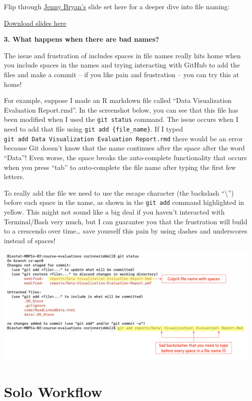 \documentclass[
]{book}
\begin{document}
Flip through \href{https://jennybryan.org/about/}{Jenny Bryan's} slide set here for a deeper dive into file naming:

\href{https://bph-storage.s3.us-west-1.amazonaws.com/git-for-humans/how-to-name-files.pdf}{Download slides here}

\textbf{3. What happens when there are bad names?}

The issue and frustration of includes spaces in file names really hits home when
you include spaces in the names and trying interacting with GitHub to add the files
and make a commit -- if you like pain and frustration -- you can try this at home!

For example, suppose I made an R markdown file called ``Data Visualization
Evaluation Report.rmd''. In the screenshot below, you can see that this file has
been modified when I used the \texttt{git\ status} command. The issue occurs when I need
to add that file using \texttt{git\ add\ \{file\_name\}}. If I typed \texttt{git\ add\ Data\ Visualization\ Evaluation\ Report.rmd}
there would be an error because Git doesn't know that the name continues after
the space after the word ``Data''! Even worse, the space breaks the auto-complete
functionality that occurs when you press ``tab'' to auto-complete the file name
after typing the first few letters.

To really add the file we need to use the escape character (the backslash ``\textbackslash{}'')
before each space in the name, as shown in the \texttt{git\ add} command highlighted in
yellow. This might not sound like a big deal
if you haven't interacted with Terminal/Bash very much, but I can guarantee you
that the frustration will build to a crescendo over time\ldots{} save yourself this
pain by using dashes and underscores instead of spaces!

\includegraphics[width=1\linewidth]{./figures/space-in-filename-pain}

\chapter{Solo Workflow}\label{solo-workflow}
\end{document}
